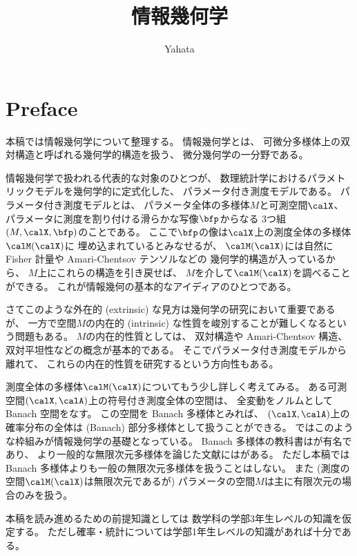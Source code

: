 \documentclass[report, notitlepage]{jlreq}
\title{情報幾何学}
\author{Yahata}
\date{}
\begin{document}
\maketitle

\chapter*{Preface}

本稿では情報幾何学について整理する。
情報幾何学とは、
可微分多様体上の双対構造と呼ばれる幾何学的構造を扱う、
微分幾何学の一分野である。

情報幾何学で扱われる代表的な対象のひとつが、
数理統計学におけるパラメトリックモデルを幾何学的に定式化した、
パラメータ付き測度モデルである。
パラメータ付き測度モデルとは、
パラメータ全体の多様体$M$と可測空間$\calX$、
パラメータに測度を割り付ける滑らかな写像$\bfp$からなる
3つ組$(M, \calX, \bfp)$のことである。
ここで$\bfp$の像は$\calX$上の測度全体の多様体$\calM(\calX)$に
埋め込まれているとみなせるが、
$\calM(\calX)$には自然に Fisher 計量や Amari-Chentsov テンソルなどの
幾何学的構造が入っているから、
$M$上にこれらの構造を引き戻せば、
$M$を介して$\calM(\calX)$を調べることができる。
これが情報幾何の基本的なアイディアのひとつである。

さてこのような外在的 (extrinsic) な見方は幾何学の研究において重要であるが、
一方で空間$M$の内在的 (intrinsic) な性質を峻別することが難しくなるという問題もある。
$M$の内在的性質としては、
双対構造や Amari-Chentsov 構造、双対平坦性などの概念が基本的である。
そこでパラメータ付き測度モデルから離れて、
これらの内在的性質を研究するという方向性もある。

測度全体の多様体$\calM(\calX)$についてもう少し詳しく考えてみる。
ある可測空間$(\calX, \calA)$上の符号付き測度全体の空間は、
全変動をノルムとして Banach 空間をなす。
この空間を Banach 多様体とみれば、
$(\calX, \calA)$上の確率分布の全体は (Banach) 部分多様体として扱うことができる。
\cite{ay_information_2017}ではこのような枠組みが情報幾何学の基礎となっている。
Banach 多様体の教科書は\cite{lang_differential_1985}が有名であり、
より一般的な無限次元多様体を論じた文献には\cite{schmeding_introduction_2022}がある。
ただし本稿では Banach 多様体よりも一般の無限次元多様体を扱うことはしない。
また (測度の空間$\calM(\calX)$は無限次元であるが)
パラメータの空間$M$は主に有限次元の場合のみを扱う。

本稿を読み進めるための前提知識としては
数学科の学部3年生レベルの知識を仮定する。
ただし確率・統計については学部1年生レベルの知識があれば十分である。

\tableofcontents
\markboth{\contentsname}{}
\end{document}
